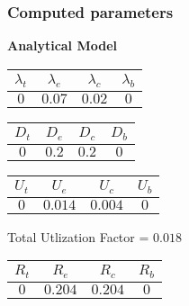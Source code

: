 \documentclass{article}
\begin{document}
\subsubsection{Computed parameters}
\begin{minipage}{0.5\textwidth}
\centering	\textbf{Analytical Model}
\begin{table}[H]
\centering
\begin{tabular}{@{}cccc@{}}
\toprule
$\lambda_t$ & $\lambda_e$ & $\lambda_c$ & $\lambda_b$\\
\midrule
$0$ & $0.07$ & $0.02$ & $0$\\
\bottomrule
\end{tabular}
\end{table}\begin{table}[H]
\centering
\begin{tabular}{@{}cccc@{}}
\toprule
$D_t$ & $D_e$ & $D_c$ & $D_b$\\
\midrule
$0$ & $0.2$ & $0.2$ & $0$\\
\bottomrule
\end{tabular}
\end{table}\begin{table}[H]
\centering
\begin{tabular}{@{}cccc@{}}
\toprule
$U_t$ & $U_e$ & $U_c$ & $U_b$\\
\midrule
$0$ & $0.014$ & $0.004$ & $0$\\
\bottomrule
\end{tabular}
\end{table}
\centering Total Utlization Factor = $0.018$
\begin{table}[H]
\centering
\begin{tabular}{@{}cccc@{}}
\toprule
$R_t$ & $R_e$ & $R_c$ & $R_b$\\
\midrule
$0$ & $0.204$ & $0.204$ & $0$\\
\bottomrule
\end{tabular}
\end{table}
\end{minipage}
\end{document}
